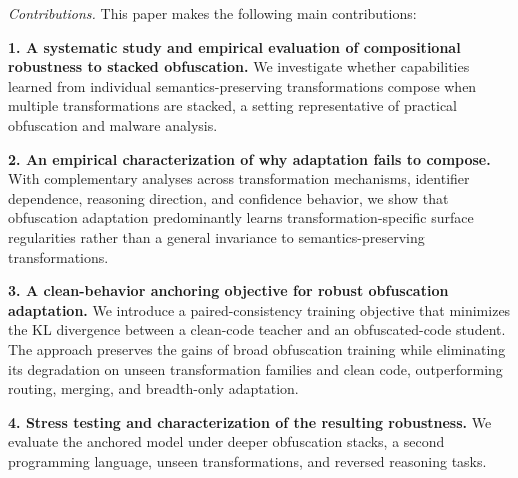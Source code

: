 {\em Contributions.} This paper makes the following main contributions:

\textbf{1. A systematic study and empirical evaluation of compositional robustness to
stacked obfuscation.}
    We investigate whether capabilities learned from individual
    semantics-preserving transformations compose when multiple
    transformations are stacked, a setting representative of practical
    obfuscation and malware analysis.


\textbf{2. An empirical characterization of why adaptation
    fails to compose.}
    With complementary analyses across transformation mechanisms,
    identifier dependence, reasoning direction, and confidence
    behavior, we show that obfuscation adaptation predominantly learns
    transformation-specific surface regularities rather than a general
    invariance to semantics-preserving transformations.

\textbf{3. A clean-behavior anchoring objective for robust
    obfuscation adaptation.}
    We introduce a paired-consistency training objective that minimizes
    the KL divergence between a clean-code teacher and an
    obfuscated-code student. The approach preserves the gains of broad
    obfuscation training while eliminating its degradation on unseen
    transformation families and clean code, outperforming routing,
    merging, and breadth-only adaptation.

\textbf{4. Stress testing and characterization of the resulting
    robustness.} We evaluate the anchored model under deeper obfuscation stacks, a
    second programming language, unseen transformations, and reversed
    reasoning tasks. 
    

